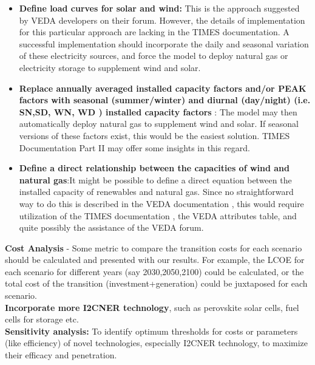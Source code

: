 \documentclass[14pt,a4paper]{article} %
\begin{document}
\begin{itemize}

\item \textbf{Define load curves for solar and wind:} This is the approach suggested by VEDA developers on their forum. However, the details of implementation for this particular approach are lacking in the \gls{TIMES} documentation. A successful implementation should incorporate the daily and seasonal variation of these electricity sources, and force the model to deploy natural gas or electricity storage to supplement wind and solar.

\item \textbf{Replace annually averaged installed  capacity factors and/or \gls{PEAK} factors with seasonal (summer/winter) and diurnal (day/night) (i.e. SN,SD, WN, WD \cite{gargiulo_documentation_2005} ) installed  capacity factors} : The model may then automatically deploy natural gas to supplement wind and solar. If seasonal versions of these factors exist, this would be the easiest solution. \gls{TIMES} Documentation Part II \cite{loulou_documentation_2005} may offer some insights in this regard.

\item \textbf{Define a direct relationship between the capacities of wind and natural gas}:It might be possible to define a direct equation between the installed  capacity of renewables and natural gas. Since no straightforward way to do this is described in the VEDA documentation \cite{gargiulo_documentation_2005}, this would require utilization of the \gls{TIMES} documentation \cite{loulou_documentation_2005}, the VEDA attributes table, and quite possibly the assistance of the VEDA forum.

\end{itemize}

\textbf{Cost Analysis} - Some metric to compare the transition costs for each scenario should be calculated and presented with our results. For example, the \gls{LCOE} for each scenario for different years (say 2030,2050,2100) could be calculated, or the total cost of the transition (investment+generation) could be juxtaposed for each scenario.\\

\textbf{Incorporate more \gls{I2CNER} technology}, such as perovskite solar cells, fuel cells for storage etc.\\

\textbf{Sensitivity analysis:} To identify optimum thresholds for costs or parameters (like efficiency) of novel technologies, especially \gls{I2CNER} technology, to maximize their efficacy and penetration.\\
\end{document}
